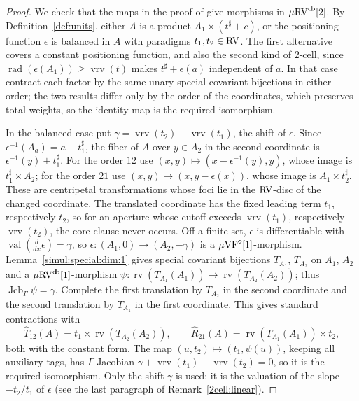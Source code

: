 \documentclass[12pt]{amsart}
\theoremstyle{plain}
\theoremstyle{definition}
\theoremstyle{remark}
\numberwithin{equation}{section}
\theoremstyle{plain}
\newcommand{\VF}{\textup{VF}}
\newcommand{\RV}{\textup{RV}}
\DeclareMathOperator{\jcb}{Jcb}
\newcommand{\0}{\emptyset}
\newcommand{\fun}{\longrightarrow}
\newcommand{\efun}{\longmapsto}
\newcommand{\mVF}{{\mu}{\VF}}
\newcommand{\mRV}{{\mu}{\RV}}
\DeclareMathOperator{\rv}{rv}
\DeclareMathOperator{\vv}{val}
\DeclareMathOperator{\rad}{rad}
\DeclareMathOperator{\vrv}{vrv}
\DeclareMathOperator{\db}{d \! b}
\newcommand{\ddx}{\tfrac{d}{d x}}
\begin{document}
\begin{proof}
We check that the maps in the proof of \cite[Lemma~5.7]{Yin:int:acvf} give morphisms in $\mRV^{\db}[2]$. By Definition~\ref{def:units}, either $A$ is a product $A_1 \times (t^\sharp + c)$, or the positioning function $\epsilon$ is balanced in $A$ with paradigms $t_1, t_2 \in \RV$. The first alternative covers a constant positioning function, and also the second kind of $2$-cell, since $\rad(\epsilon(A_1)) \geq \vrv(t)$ makes $t^\sharp + \epsilon(a)$ independent of $a$. In that case contract each factor by the same unary special covariant bijections in either order; the two results differ only by the order of the coordinates, which preserves total weights, so the identity map is the required isomorphism.

In the balanced case put $\gamma = \vrv(t_2) - \vrv(t_1)$, the shift of $\epsilon$. Since $\epsilon^{-1}(A_a) = a - t_1^\sharp$, the fiber of $A$ over $y \in A_2$ in the second coordinate is $\epsilon^{-1}(y) + t_1^\sharp$. For the order $12$ use $(x, y) \efun (x - \epsilon^{-1}(y), y)$, whose image is $t_1^\sharp \times A_2$; for the order $21$ use $(x, y) \efun (x, y - \epsilon(x))$, whose image is $A_1 \times t_2^\sharp$. These are centripetal transformations whose foci lie in the $\RV$-disc of the changed coordinate. The translated coordinate has the fixed leading term $t_1$, respectively $t_2$, so for an aperture whose cutoff exceeds $\vrv(t_1)$, respectively $\vrv(t_2)$, the core clause never occurs. Off a finite set, $\epsilon$ is differentiable with $\vv(\ddx \epsilon) = \gamma$, so $\epsilon : (A_1, 0) \fun (A_2, -\gamma)$ is a $\mVF^\diamond[1]$-morphism. Lemma~\ref{simul:special:dim:1} gives special covariant bijections $T_{A_1}$, $T_{A_2}$ on $A_1$, $A_2$ and a $\mRV^{\db}[1]$-morphism $\psi : \rv(T_{A_1}(A_1)) \fun \rv(T_{A_2}(A_2))$; thus $\jcb_\Gamma \psi = \gamma$. Complete the first translation by $T_{A_2}$ in the second coordinate and the second translation by $T_{A_1}$ in the first coordinate. This gives standard contractions with
\[
\hat T_{12}(A) = t_1 \times \rv(T_{A_2}(A_2)), \qquad \hat R_{21}(A) = \rv(T_{A_1}(A_1)) \times t_2,
\]
both with the constant form. The map $(u, t_2) \efun (t_1, \psi(u))$, keeping all auxiliary tags, has $\Gamma$-Jacobian $\gamma + \vrv(t_1) - \vrv(t_2) = 0$, so it is the required isomorphism. Only the shift $\gamma$ is used; it is the valuation of the slope $-t_2/t_1$ of $\epsilon$ (see the last paragraph of Remark~\ref{2cell:linear}).


\end{proof}
\end{document}
